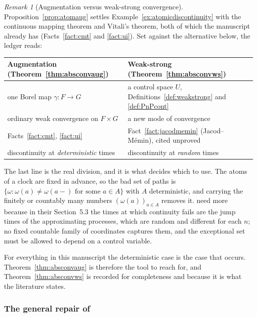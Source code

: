 \documentclass[11pt,a4paper]{article}
\theoremstyle{plain}
\theoremstyle{definition}
\theoremstyle{remark}
\newtheorem{remark}[theorem]{Remark}
\newcommand{\CPS}{\cite{CPS23}}
\begin{document}
\begin{remark}[Augmentation versus weak-strong convergence]
  \label{rem:augvsws}
  Proposition~\ref{prop:atomaug} settles Example~\ref{ex:atomicdiscontinuity}
  with the continuous mapping theorem and Vitali's theorem, both of which the
  manuscript already has (Facts~\ref{fact:cmt} and \ref{fact:ui}).  Set against
  the alternative below, the ledger reads:
  \begin{center}
  \begin{tabular}{@{}p{}p{}@{}}
  \toprule
  \textbf{Augmentation} (Theorem~\ref{thm:absconvaug}) &
  \textbf{Weak-strong} (Theorem~\ref{thm:absconvws}) \\
  \midrule
  one Borel map $\gamma : F \to G$ &
  a control space $U$, Definitions~\ref{def:weakstrong} and \ref{def:PnPcont} \\
  ordinary weak convergence on $F \times G$ &
  a new mode of convergence \\
  Facts~\ref{fact:cmt}, \ref{fact:ui} &
  Fact~\ref{fact:jacodmemin} (Jacod--M\'emin), cited unproved \\
  discontinuity at \emph{deterministic} times &
  discontinuity at \emph{random} times \\
  \bottomrule
  \end{tabular}
  \end{center}
  The last line is the real division, and it is what decides which to use.  The
  atoms of a clock are fixed in advance, so the bad set of paths is
  $\{\omega : \omega(a) \neq \omega(a-) \text{ for some } a \in A\}$ with $A$
  deterministic, and carrying the finitely or countably many numbers
  $(\omega(a))_{a \in A}$ removes it.  \CPS{} need more because in their
  Section~5.3 the times at which continuity fails are the jump times of the
  approximating processes, which are random and different for each $n$; no fixed
  countable family of coordinates captures them, and the exceptional set must be
  allowed to depend on a control variable.

  For everything in this manuscript the deterministic case is the case that
  occurs.  Theorem~\ref{thm:absconvaug} is therefore the tool to reach for, and
  Theorem~\ref{thm:absconvws} is recorded for completeness and because it is what
  the literature states.
\end{remark}

\subsubsection*{The general repair of \CPS}
\end{document}
